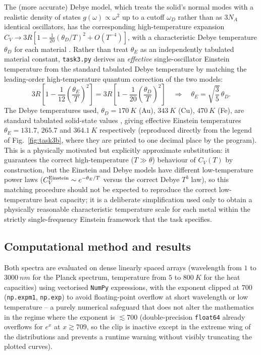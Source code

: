 \documentclass[11pt]{article}
\begin{document}
The (more accurate) Debye model, which treats the solid's normal modes with a realistic density of states $g(\omega)\propto\omega^2$ up to a cutoff $\omega_D$ rather than as $3N_A$ identical oscillators, has the corresponding high-temperature expansion $C_V \to 3R[1 - \tfrac{1}{20}(\theta_D/T)^2 + O(T^{-4})]$, with a characteristic Debye temperature $\theta_D$ for each material \cite{kittel}. Rather than treat $\theta_E$ as an independently tabulated material constant, \texttt{task3.py} derives an \emph{effective} single-oscillator Einstein temperature from the standard tabulated Debye temperature by matching the leading-order high-temperature quantum correction of the two models:
\begin{equation}
3R\left[1-\frac{1}{12}\left(\frac{\theta_E}{T}\right)^2\right] = 3R\left[1-\frac{1}{20}\left(\frac{\theta_D}{T}\right)^2\right]
\quad\Longrightarrow\quad
\theta_E = \sqrt{\frac{3}{5}}\,\theta_D .
\label{eq:thetaE}
\end{equation}
The Debye temperatures used, $\theta_D=\SI{170}{K}$ (Au), $\SI{343}{K}$ (Cu), $\SI{470}{K}$ (Fe), are standard tabulated solid-state values \cite{kittel}, giving effective Einstein temperatures $\theta_E = 131.7$, $265.7$ and $\SI{364.1}{K}$ respectively (reproduced directly from the legend of Fig.~\ref{fig:task3b}, where they are printed to one decimal place by the program). This is a physically motivated but explicitly approximate substitution: it guarantees the correct high-temperature ($T\gg\theta$) behaviour of $C_V(T)$ by construction, but the Einstein and Debye models have different low-temperature power laws ($C_V^{\rm Einstein}\sim e^{-\theta_E/T}$ versus the correct Debye $T^3$ law), so this matching procedure should not be expected to reproduce the correct low-temperature heat capacity; it is a deliberate simplification used only to obtain a physically reasonable characteristic temperature scale for each metal within the strictly single-frequency Einstein framework that the task specifies.

\subsection{Computational method and results}
Both spectra are evaluated on dense linearly spaced arrays (wavelength from $1$ to $\SI{3000}{nm}$ for the Planck spectrum, temperature from $5$ to $\SI{800}{K}$ for the heat capacities) using vectorised \texttt{NumPy} expressions, with the exponent clipped at $700$ (\texttt{np.expm1}, \texttt{np.exp}) to avoid floating-point overflow at short wavelength or low temperature -- a purely numerical safeguard that does not alter the mathematics in the regime where the exponent is $\lesssim700$ (double-precision \texttt{float64} already overflows for $e^x$ at $x\gtrsim709$, so the clip is inactive except in the extreme wing of the distributions and prevents a runtime warning without visibly truncating the plotted curves).
\end{document}
